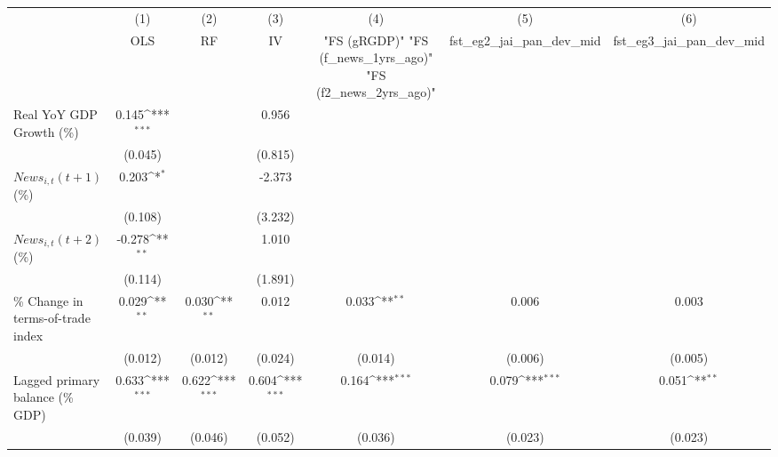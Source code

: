 {
\def\sym#1{\ifmmode^{#1}\else\(^{#1}\)\fi}
\begin{tabular}{l*{6}{c}}
\toprule
                    &\multicolumn{1}{c}{(1)}&\multicolumn{1}{c}{(2)}&\multicolumn{1}{c}{(3)}&\multicolumn{1}{c}{(4)}&\multicolumn{1}{c}{(5)}&\multicolumn{1}{c}{(6)}\\
                    &\multicolumn{1}{c}{OLS}&\multicolumn{1}{c}{RF}&\multicolumn{1}{c}{IV}&\multicolumn{1}{c}{ "FS (gRGDP)"  "FS (f_news_1yrs_ago)"  "FS (f2_news_2yrs_ago)" }&\multicolumn{1}{c}{fst_eg2_jai_pan_dev_mid}&\multicolumn{1}{c}{fst_eg3_jai_pan_dev_mid}\\
\midrule
Real YoY GDP Growth (\%)&       0.145\sym{***}&                     &       0.956         &                     &                     &                     \\
                    &     (0.045)         &                     &     (0.815)         &                     &                     &                     \\
\addlinespace
$ News_{i,t}(t+1)$ (\%)&       0.203\sym{*}  &                     &      -2.373         &                     &                     &                     \\
                    &     (0.108)         &                     &     (3.232)         &                     &                     &                     \\
\addlinespace
$ News_{i,t}(t+2)$ (\%)&      -0.278\sym{**} &                     &       1.010         &                     &                     &                     \\
                    &     (0.114)         &                     &     (1.891)         &                     &                     &                     \\
\addlinespace
\% Change in terms-of-trade index&       0.029\sym{**} &       0.030\sym{**} &       0.012         &       0.033\sym{**} &       0.006         &       0.003         \\
                    &     (0.012)         &     (0.012)         &     (0.024)         &     (0.014)         &     (0.006)         &     (0.005)         \\
\addlinespace
Lagged primary balance (\% GDP)&       0.633\sym{***}&       0.622\sym{***}&       0.604\sym{***}&       0.164\sym{***}&       0.079\sym{***}&       0.051\sym{**} \\
                    &     (0.039)         &     (0.046)         &     (0.052)         &     (0.036)         &     (0.023)         &     (0.023)         \\

\end{tabular}}
